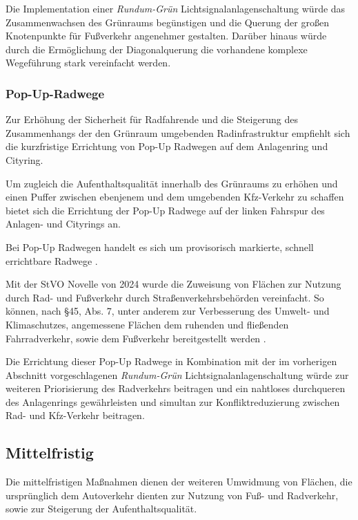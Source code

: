\documentclass[a4paper,12pt]{article}
\begin{document}
Die Implementation einer \textit{Rundum-Grün} Lichtsignalanlagenschaltung würde das Zusammenwachsen des Grünraums begünstigen und die Querung der großen Knotenpunkte für Fußverkehr angenehmer gestalten. Darüber hinaus würde durch die Ermöglichung der Diagonalquerung die vorhandene komplexe Wegeführung stark vereinfacht werden. 

\subsubsection{Pop-Up-Radwege}

Zur Erhöhung der Sicherheit für Radfahrende und die Steigerung des Zusammenhangs der den Grünraum umgebenden Radinfrastruktur empfiehlt sich die kurzfristige Errichtung von Pop-Up Radwegen auf dem Anlagenring und Cityring. 

Um zugleich die Aufenthaltsqualität innerhalb des Grünraums zu erhöhen und einen Puffer zwischen ebenjenem und dem umgebenden Kfz-Verkehr zu schaffen bietet sich die Errichtung der Pop-Up Radwege auf der linken Fahrspur des Anlagen- und Cityrings an.

Bei Pop-Up Radwegen handelt es sich um provisorisch markierte, schnell errichtbare Radwege \autocite{PopupRadwege}.

Mit der StVO Novelle von 2024 wurde die Zuweisung von Flächen zur Nutzung durch Rad- und Fußverkehr durch Straßenverkehrsbehörden vereinfacht. So können, nach §45, Abs. 7, unter anderem zur Verbesserung des Umwelt- und Klimaschutzes, angemessene Flächen dem ruhenden und fließenden Fahrradverkehr, sowie dem Fußverkehr bereitgestellt werden \autocite{VerkehrszeichenUndVerkehrseinrichtungen}.

Die Errichtung dieser Pop-Up Radwege in Kombination mit der im vorherigen Abschnitt vorgeschlagenen \textit{Rundum-Grün} Lichtsignalanlagenschaltung würde zur weiteren Priorisierung des Radverkehrs beitragen und ein nahtloses durchqueren des Anlagenrings gewährleisten und simultan zur Konfliktreduzierung zwischen Rad- und Kfz-Verkehr beitragen.

\subsection{Mittelfristig}

Die mittelfristigen Maßnahmen dienen der weiteren Umwidmung von Flächen, die ursprünglich dem Autoverkehr dienten zur Nutzung von Fuß- und Radverkehr, sowie zur Steigerung der Aufenthaltsqualität.
\end{document}
